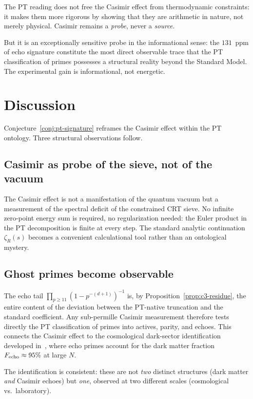\documentclass[11pt,a4paper]{article}
\newcommand{\zetaR}{\zeta_R}
\begin{document}
The PT reading does not free the Casimir effect from thermodynamic constraints: it makes them
more rigorous by showing that they are arithmetic in nature, not merely physical. Casimir
remains a \emph{probe}, never a \emph{source}.

But it is an exceptionally sensitive probe in the informational sense: the $131$~ppm of
echo signature constitute the most direct observable trace that the PT classification of
primes possesses a structural reality beyond the Standard Model. The experimental gain is
informational, not energetic.

\section{Discussion}
\label{sec:discussion}

Conjecture~\ref{conj:pt-signature} reframes the Casimir effect within the PT ontology. Three
structural observations follow.

\subsection{Casimir as probe of the sieve, not of the vacuum}

The Casimir effect is not a manifestation of the quantum vacuum but a measurement of the
spectral deficit of the constrained CRT sieve. No infinite zero-point energy sum is required,
no regularization needed: the Euler product in the PT decomposition is finite at every step.
The standard analytic continuation $\zetaR(s)$ becomes a convenient calculational tool rather
than an ontological mystery.

\subsection{Ghost primes become observable}

The echo tail $\prod_{p \geq 11}(1-p^{-(d+1)})^{-1}$ is, by Proposition~\ref{prop:c3-residue},
the entire content of the deviation between the PT-native truncation and the standard
coefficient. Any sub-permille Casimir measurement therefore tests directly the PT
classification of primes into actives, parity, and echoes. This connects the Casimir effect
to the cosmological dark-sector identification developed in~\cite{Senez2026}, where echo
primes account for the dark matter fraction $F_{\rm echo} \approx 95\%$ at large $N$.

The identification is consistent: these are not \emph{two} distinct structures (dark matter
\emph{and} Casimir echoes) but \emph{one}, observed at two different scales (cosmological
vs.\ laboratory).
\end{document}
